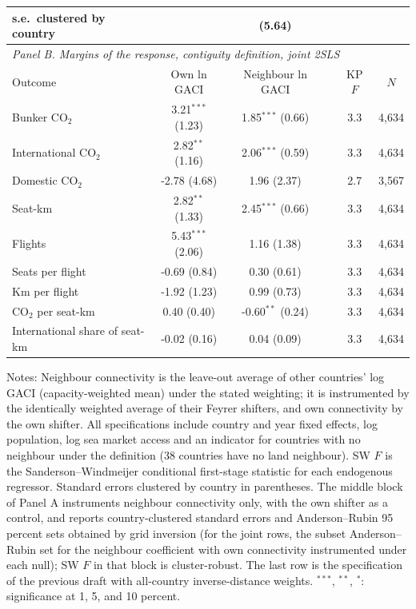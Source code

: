 \documentclass[12pt]{extarticle}
\begin{document}
\begin{table}[H]
{\begin{threeparttable}
\begin{tabular}{lccccc}
  \quad s.e.\ clustered by country & & (5.64) & & & \\
\midrule
\multicolumn{6}{l}{\textit{Panel B. Margins of the response, contiguity definition, joint 2SLS}} \\
Outcome & Own ln GACI & Neighbour ln GACI & & KP $F$ & $N$ \\
\midrule
  Bunker CO$_2$ & 3.21$^{***}$ (1.23) & 1.85$^{***}$ (0.66) & & 3.3 & 4,634 \\
  International CO$_2$ & 2.82$^{**}$ (1.16) & 2.06$^{***}$ (0.59) & & 3.3 & 4,634 \\
  Domestic CO$_2$ & -2.78 (4.68) & 1.96 (2.37) & & 2.7 & 3,567 \\
  Seat-km & 2.82$^{**}$ (1.33) & 2.45$^{***}$ (0.66) & & 3.3 & 4,634 \\
  Flights & 5.43$^{***}$ (2.06) & 1.16 (1.38) & & 3.3 & 4,634 \\
  Seats per flight & -0.69 (0.84) & 0.30 (0.61) & & 3.3 & 4,634 \\
  Km per flight & -1.92 (1.23) & 0.99 (0.73) & & 3.3 & 4,634 \\
  CO$_2$ per seat-km & 0.40 (0.40) & -0.60$^{**}$ (0.24) & & 3.3 & 4,634 \\
  International share of seat-km & -0.02 (0.16) & 0.04 (0.09) & & 3.3 & 4,634 \\
\bottomrule
\end{tabular}
\begin{tablenotes}[flushleft]
\footnotesize
\item Notes: Neighbour connectivity is the leave-out average of other countries' log GACI (capacity-weighted mean) under the stated weighting; it is instrumented by the identically weighted average of their Feyrer shifters, and own connectivity by the own shifter. All specifications include country and year fixed effects, log population, log sea market access and an indicator for countries with no neighbour under the definition (38 countries have no land neighbour). SW $F$ is the Sanderson--Windmeijer conditional first-stage statistic for each endogenous regressor. Standard errors clustered by country in parentheses. The middle block of Panel A instruments neighbour connectivity only, with the own shifter as a control, and reports country-clustered standard errors and Anderson--Rubin 95 percent sets obtained by grid inversion (for the joint rows, the subset Anderson--Rubin set for the neighbour coefficient with own connectivity instrumented under each null); SW $F$ in that block is cluster-robust. The last row is the specification of the previous draft with all-country inverse-distance weights. $^{***}$, $^{**}$, $^{*}$: significance at 1, 5, and 10 percent.
\end{tablenotes}
\end{threeparttable}}
\end{table}
\end{document}
